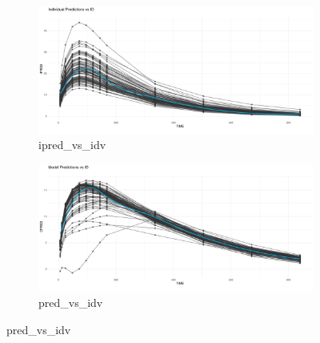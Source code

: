 \begin{figure}[htbp]
    \begin{subfigure}[b]{0.45\linewidth}
        \centering
        \includegraphics[width=\linewidth]{fig/img/Xpose/ipred_vs_idv.pdf}
        \caption{ipred\_vs\_idv}
        \label{fig:ipred_vs_idv}
    \end{subfigure}
    \hfill
    \begin{subfigure}[b]{0.45\linewidth}
        \centering
        \includegraphics[width=\linewidth]{fig/img/Xpose/pred_vs_idv.pdf}
        \caption{pred\_vs\_idv}
        \label{fig:pred_vs_idv}
    \end{subfigure}

    \vspace{1em}


\end{figure}
